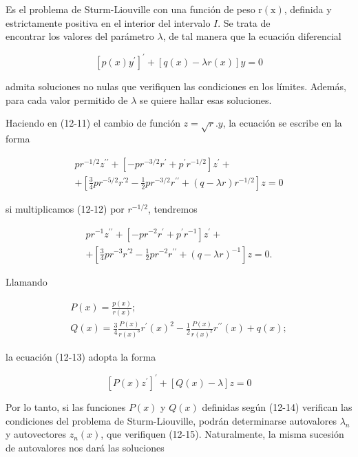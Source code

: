 \documentclass[10pt]{article}
\theoremstyle{plain}
\theoremstyle{definition}
\theoremstyle{remark}
\begin{document}
Es el problema de Sturm-Liouville con una función de peso $\mathrm{r}(\mathrm{x})$, definida y estrictamente positiva en el interior del intervalo $I$. Se trata de\\
encontrar los valores del parámetro $\lambda$, de tal manera que la ecuación diferencial


\begin{equation*}
\left[p(x) y^{\prime}\right]^{\prime}+[q(x)-\lambda r(x)] y=0 \tag{12-11}
\end{equation*}


admita soluciones no nulas que verifiquen las condiciones en los límites. Además, para cada valor permitido de $\lambda$ se quiere hallar esas soluciones.

Haciendo en (12-11) el cambio de función $z=\sqrt{r} . y$, la ecuación se escribe en la forma


\begin{gather*}
p r^{-1 / 2} z^{\prime \prime}+\left[-p r^{-3 / 2} r^{\prime}+p^{\prime} r^{-1 / 2}\right] z^{\prime}+ \\
+\left[\frac{3}{4} p r^{-5 / 2} r^{\prime 2}-\frac{1}{2} p r^{-3 / 2} r^{\prime \prime}+(q-\lambda r) r^{-1 / 2}\right] z=0 \tag{12-12}
\end{gather*}


si multiplicamos (12-12) por $r^{-1 / 2}$, tendremos


\begin{gather*}
p r^{-1} z^{\prime \prime}+\left[-p r^{-2} r^{\prime}+p^{\prime} r^{-1}\right] z^{\prime}+ \\
+\left[\frac{3}{4} p r^{-3} r^{\prime 2}-\frac{1}{2} p r^{-2} r^{\prime \prime}+(q-\lambda r)^{-1}\right] z=0 . \tag{12-13}
\end{gather*}


Llamando


\begin{gather*}
P(x)=\frac{p(x)}{r(x)} ; \\
Q(x)=\frac{3}{4} \frac{P(x)}{r(x)^{3}} r^{\prime}(x)^{2}-\frac{1}{2} \frac{P(x)}{r(x)^{2}} r^{\prime \prime}(x)+q(x) ; \tag{12-14}
\end{gather*}


la ecuación (12-13) adopta la forma


\begin{equation*}
\left[P(x) z^{\prime}\right]^{\prime}+[Q(x)-\lambda] z=0 \tag{12-15}
\end{equation*}



Por lo tanto, si las funciones $P(x)$ y $Q(x)$ definidas según (12-14) verifican las condiciones del problema de Sturm-Liouville, podrán determinarse autovalores $\lambda_{n}$ y autovectores $z_{n}(x)$, que verifiquen (12-15). Naturalmente, la misma sucesión de autovalores nos dará las soluciones
\end{document}
